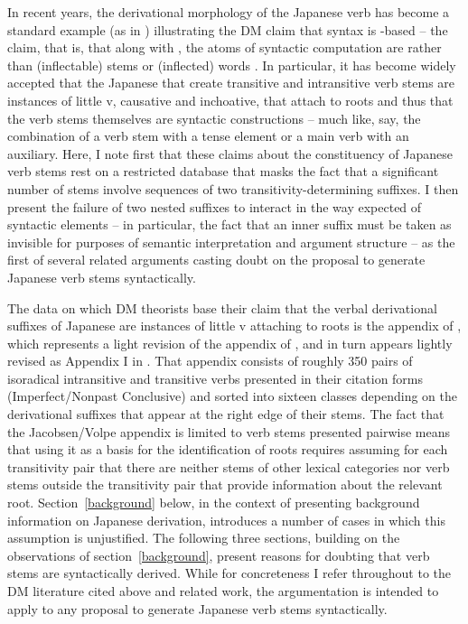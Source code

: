 \documentclass[output=paper,
modfonts
]{LSP/langsci}
\begin{document}
In recent years, the derivational morphology of the Japanese verb has
become a standard example (as in \citealt{harley2012a}) illustrating the DM claim
that syntax is -based -- the claim, that is, that along with
, the atoms of syntactic computation are 
rather than (inflectable) stems or (inflected) words \citep[5]{embick2008a}. In particular, it has become widely accepted \citep[106]{marantz2013a}
that the Japanese  that create transitive and intransitive verb
stems are instances of little v, causative and inchoative, that attach
to roots and thus that the verb stems themselves are syntactic
constructions -- much like, say, the combination of a verb stem with a
tense element or a main verb with an auxiliary. Here, I note first that
these claims about the constituency of Japanese verb stems rest on a
restricted database that masks the fact that a significant number of
stems involve sequences of two transitivity-determining suffixes. I then
present the failure of two nested suffixes to interact in the way
expected of syntactic elements -- in particular, the fact that an inner
suffix must be taken as invisible for purposes of semantic
interpretation and argument structure -- as the first of several related
arguments casting doubt on the proposal to generate Japanese verb stems
syntactically.

The data on which DM theorists base their claim that the verbal
derivational suffixes of Japanese are instances of little v attaching to
roots is the appendix of \citet{jacobsen1992a}, which represents a light
revision of the appendix of \citet{jacobsen1982a}, and in turn appears lightly
revised as Appendix I in \citet{volpe2005a}. That appendix consists of roughly
350 pairs of isoradical intransitive and transitive verbs presented in
their citation forms (Imperfect/Nonpast Conclusive) and sorted into
sixteen classes depending on the derivational suffixes that appear at
the right edge of their stems. The fact that the Jacobsen/Volpe appendix
is limited to verb stems presented pairwise means that using it as a
basis for the identification of roots requires assuming for each
transitivity pair that there are neither stems of other lexical
categories nor verb stems outside the transitivity pair that provide
information about the relevant root. Section~\ref{background} below, in the context of
presenting background information on Japanese derivation, introduces a
number of cases in which this assumption is unjustified. The following
three sections, building on the observations of section~\ref{background}, present
reasons for doubting that verb stems are syntactically derived. While
for concreteness I refer throughout to the DM literature cited above and
related work, the argumentation is intended to apply to any proposal to
generate Japanese verb stems syntactically.
\end{document}

